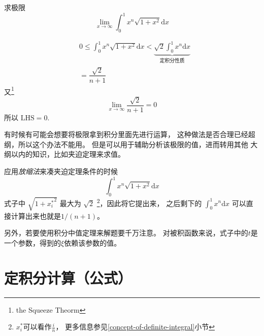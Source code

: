 \begin{example}
    求极限
    \[
        \lim_{x \to \infty} \int_0^1 x^n \sqrt{1+x^2} \mathrm{d}x
    \]
    \cite[page 106, pdf 117]{we}

    \begin{align*}
        &0 \leq \int_0^1 x^n \sqrt{1+x^2} \mathrm{d}x 
        < \underbrace{\sqrt{2} \int_0^1 x^n 
        \mathrm{d}x}_{\mbox{定积分性质}} \\
        &= \dfrac{\sqrt{2}}{n+1}
    \end{align*}
    又\footnote{the Squeeze Theorm}
    \[
        \lim_{x\to \infty} \dfrac{\sqrt{2}}{n+1} = 0
    \]
    所以 $\mbox{LHS} = 0$.
\end{example}
有时候有可能会想要将极限拿到积分里面先进行运算，
这种做法是否合理已经超纲，所以这个办法不能用。
但是可以用于辅助分析该极限的值，进而转用其他
大纲以内的知识，比如夹迫定理来求值。

应用\emph{放缩法}来凑夹迫定理条件的时候
\[
    \int_0^1 x^n \sqrt{1+x^2} \mathrm{d}x
\]
式子中 $\sqrt{1+{x^{*}_{i}}^2}$ 最大为 $\sqrt{2}$
\footnote{
    ${x^{*}_{i}}$可以看作$\frac{i}{n}$，
    更多信息参见\ref{concept-of-definite-integral}小节
}，因此将它提出来，
之后剩下的 $\int_0^1 x^n \mathrm{d}x$ 可以直接计算出来也就是$1/(n+1)$。

另外，若要使用积分中值定理来解题要千万注意。
对被积函数来说，式子中的$t$是一个参数，得到的$\xi$依赖该参数的值。


\section{定积分计算（公式）}

